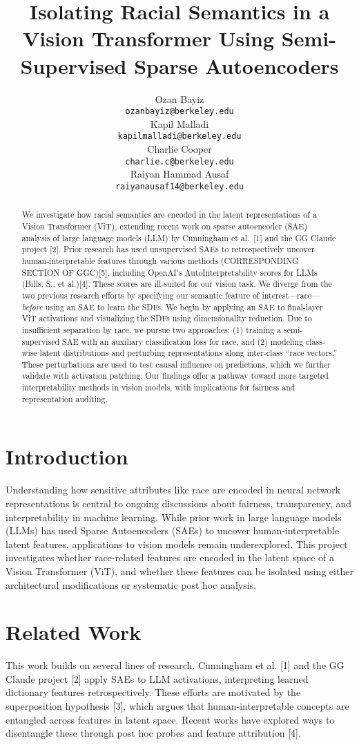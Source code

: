 \documentclass{article}
\title{Isolating Racial Semantics in a Vision Transformer Using Semi-Supervised Sparse Autoencoders}
\author{
  Ozan Bayiz\\
  \texttt{ozanbayiz@berkeley.edu} \\
  \And
  Kapil Malladi \\
  \texttt{kapilmalladi@berkeley.edu} \\
  \AND
  Charlie Cooper\\
  \texttt{charlie.c@berkeley.edu} \\
  \And
  Raiyan Hammad Ausaf \\
  \texttt{raiyanausaf14@berkeley.edu} \\
}
\begin{document}
\maketitle


\begin{abstract}
We investigate how racial semantics are encoded in the latent representations of a Vision Transformer (ViT), extending recent work on sparse autoencoder (SAE) analysis of large language models (LLM) by Cunningham et al.\ [1] and the GG Claude project [2]. Prior research has used unsupervised SAEs to retrospectively uncover human-interpretable features through various methods  (CORRESPONDING SECTION OF GGC)[5], including OpenAI's AutoInterpretability scores for LLMs (Bills, S., et al.)[4]. These scores are ill-suited for our vision task. We diverge from the two previous research efforts by specifying our semantic feature of interest—race—\textit{before} using an SAE to learn the SDFs. We begin by applying an SAE to final-layer ViT activations and visualizing the SDFs using dimensionality reduction. Due to insufficient separation by race, we pursue two approaches: (1) training a semi-supervised SAE with an auxiliary classification loss for race, and (2) modeling class-wise latent distributions and perturbing representations along inter-class “race vectors.” These perturbations are used to test causal influence on predictions, which we further validate with activation patching. Our findings offer a pathway toward more targeted interpretability methods in vision models, with implications for fairness and representation auditing.
\end{abstract}


\section{Introduction}
Understanding how sensitive attributes like race are encoded in neural network representations is central to ongoing discussions about fairness, transparency, and interpretability in machine learning. While prior work in large language models (LLMs) has used Sparse Autoencoders (SAEs) to uncover human-interpretable latent features, applications to vision models remain underexplored. This project investigates whether race-related features are encoded in the latent space of a Vision Transformer (ViT), and whether these features can be isolated using either architectural modifications or systematic post hoc analysis.


\section{Related Work}
This work builds on several lines of research. Cunningham et al. [1] and the GG Claude project [2] apply SAEs to LLM activations, interpreting learned dictionary features retrospectively. These efforts are motivated by the superposition hypothesis [3], which argues that human-interpretable concepts are entangled across features in latent space. Recent works have explored ways to disentangle these through post hoc probes and feature attribution [4].
\end{document}
